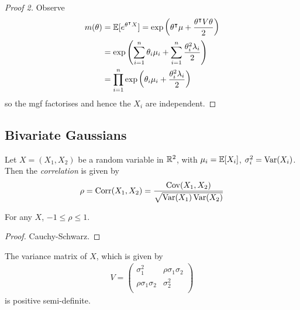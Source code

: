 \documentclass{../../template/note}
\begin{document}
    \begin{proof}[Proof 2]
        Observe
        \begin{align*}
            m(\theta) &= \mathbb E[e^{\theta^\intercal X}] = \exp\left(\theta^\intercal \mu + \frac{\theta^\intercal V \theta} 2\right) \\
            &= \exp\left(\sum_{i=1}^n \theta_i \mu_i + \sum_{i=1}^n \frac{\theta_i^2 \lambda_i}2\right) \\
            &= \prod_{i=1}^n \exp\left(\theta_i \mu_i + \frac{\theta_i^2 \lambda_i} 2\right)
        \end{align*}
        so the mgf factorises and hence the \(X_i\) are independent.
    \end{proof}
    
    \subsection{Bivariate Gaussians}

    \begin{definition}[Correlation]
        Let \(X = (X_1, X_2)\) be a random variable in \(\mathbb R^2\), with \(\mu_i = \mathbb E[X_i]\), \(\sigma^2_i = \operatorname{Var}(X_i)\). Then the \emph{correlation} is given by
        \begin{align*}
            \rho = \operatorname{Corr}(X_1, X_2) = \frac{\operatorname{Cov}(X_1, X_2)}{\sqrt{\operatorname{Var}(X_1)\operatorname{Var}(X_2)}}
        \end{align*}
    \end{definition}
    
    \begin{lemma}
        For any \(X\), \(-1 \leq \rho \leq 1\).
    \end{lemma}

    \begin{proof}
        Cauchy-Schwarz.
    \end{proof}

    \begin{lemma}
        The variance matrix of \(X\), which is given by
        \begin{align*}
            V = \begin{pmatrix}
                \sigma_1^2 & \rho\sigma_1\sigma_2 \\
                \rho\sigma_1\sigma_2 & \sigma_2^2 \\
            \end{pmatrix}
        \end{align*}
        is positive semi-definite.        
    \end{lemma}
    
\end{document}
